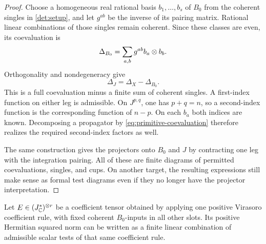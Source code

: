 \begin{proof}
Choose a homogeneous real rational basis \(b_1,\ldots,b_s\) of \(B_0\) from the coherent singles in \cref{det:setup}, and let \(g^{ab}\) be the inverse of its pairing matrix. Rational linear combinations of those singles remain coherent. Since these classes are even, its coevaluation is
\[
 \Delta_{B_0}=\sum_{a,b}g^{ab}b_a\otimes b_b.
\]
Orthogonality and nondegeneracy give
\begin{equation}\label{eq:primitive-coevaluation}
 \Delta_J=\Delta_X-\Delta_{B_0}.
\end{equation}
This is a full coevaluation minus a finite sum of coherent singles. A first-index function on either leg is admissible. On \(J^{p,q}\), one has \(p+q=n\), so a second-index function is the corresponding function of \(n-p\). On each \(b_a\) both indices are known. Decomposing a propagator by \eqref{eq:primitive-coevaluation} therefore realizes the required second-index factors as well.

The same construction gives the projectors onto \(B_0\) and \(J\) by contracting one leg with the integration pairing. All of these are finite diagrams of permitted coevaluations, singles, and cups. On another target, the resulting expressions still make sense as formal test diagrams even if they no longer have the projector interpretation.
\end{proof}

\begin{lemma}\label{det:norm}
Let \(E\in(J_\mathbb C^*)^{\otimes r}\) be a coefficient tensor obtained by applying one positive Virasoro coefficient rule, with fixed coherent \(B_0\)-inputs in all other slots. Its positive Hermitian squared norm can be written as a finite linear combination of admissible scalar tests of that same coefficient rule.
\end{lemma}

